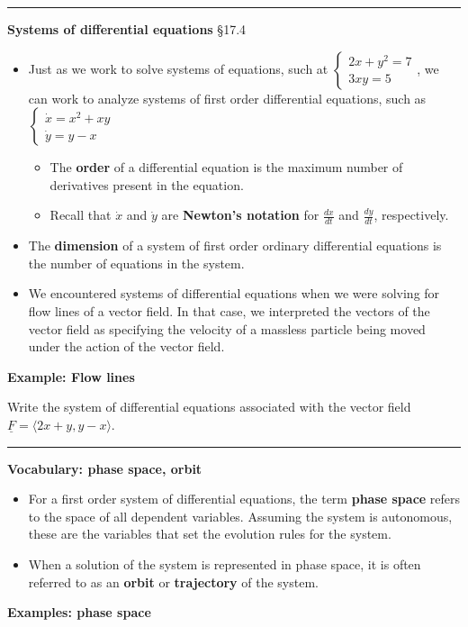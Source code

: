 \documentclass[12pt,letterpaper,noanswers]{exam}
\begin{document}
\vfill

\vspace{0.2cm}
\hrule
\vspace{0.2cm}

\noindent\textbf{Systems of differential equations} \S 17.4
\begin{tcolorbox}
\begin{itemize}
\itemsep0em
    \item Just as we work to solve systems of equations, such at $\left\{\begin{array}{l}2x + y^2 = 7 \\ 3xy = 5\end{array}\right.$, we can work to analyze systems of first order differential equations, such as $\left\{\begin{array}{l}\dot{x} = x^2 + xy \\ \dot{y} = y-x\end{array}\right.$
    \begin{itemize}
    \itemsep0em
        \item The \textbf{order} of a differential equation is the maximum number of derivatives present in the equation.
    \item Recall that $\dot x$ and $\dot y$ are \textbf{Newton's notation} for $\frac{dx}{dt}$ and $\frac{dy}{dt}$, respectively.
    \end{itemize}
    \item The \textbf{dimension} of a system of first order ordinary differential equations is the number of equations in the system.
    \item We encountered systems of differential equations when we were solving for flow lines of a vector field.  In that case, we interpreted the vectors of the vector field as specifying the velocity of a massless particle being moved under the action of the vector field.
    \end{itemize}
    \end{tcolorbox}
    \noindent\textbf{Example: Flow lines} 
    
    Write the system of differential equations associated with the vector field $\underline F = \langle 2x + y, y - x\rangle$.
    \vfill
    
    \eject
    \vspace{0.2cm}
\hrule
\vspace{0.2cm}

    \noindent\textbf{Vocabulary: phase space, orbit}
    \begin{tcolorbox}
    \begin{itemize}
    \itemsep0em
        \item For a first order system of differential equations, the term \textbf{phase space} refers to the space of all dependent variables.  Assuming the system is autonomous, these are the variables that set the evolution rules for the system.
        \item When a solution of the system is represented in phase space, it is often referred to as an \textbf{orbit} or \textbf{trajectory} of the system.
    \end{itemize}
    \end{tcolorbox}
    \noindent\textbf{Examples: phase space}
    
\end{document}
